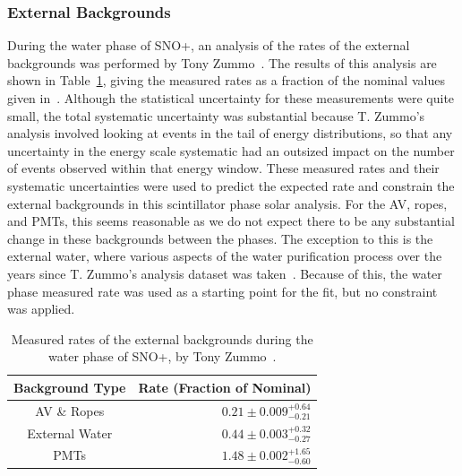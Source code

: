 \subsubsection{External Backgrounds}
During the water phase of SNO+, an analysis of the rates of the external backgrounds was performed by Tony Zummo~\cite{zummoExternalBackgroundBox2022}. %
The results of this analysis are shown in Table~\ref{tab:externals_rates_zummo}, giving the measured rates as a fraction of the nominal values given in~\cite{andringaCurrentStatusFuture2016}. %
Although the statistical uncertainty for these measurements were quite small, the total systematic uncertainty was substantial because T. Zummo's analysis involved looking at events in the tail of energy distributions, so that any uncertainty in the energy scale systematic had an outsized impact on the number of events observed within that energy window. These measured rates and their systematic uncertainties were used to predict the expected rate and constrain the external backgrounds in this scintillator phase solar analysis. For the AV, ropes, and PMTs, this seems reasonable as we do not expect there to be any substantial change in these backgrounds between the phases. The exception to this is the external water, where various aspects of the water purification process over the years since T. Zummo's analysis dataset was taken~\cite{kaptanogluFirstLookExternal2023}. Because of this, the water phase measured rate was used as a starting point for the fit, but no constraint was applied.

\begin{table}
    \centering
    \begin{tabular}{c r}
        \hline
        Background Type & Rate (Fraction of Nominal)  \\ \hline \hline
        AV \& Ropes    & $0.21\pm0.009^{+0.64}_{-0.21}$  \\
        External Water & $0.44\pm0.003^{+0.32}_{-0.27}$  \\
        PMTs           & $1.48\pm0.002^{+1.65}_{-0.60}$  \\
        \hline
    \end{tabular}
    \caption[Measured rates of the external backgrounds during the water phase of SNO+, by Tony Zummo]
    {Measured rates of the external backgrounds during the water phase of SNO+, by Tony Zummo~\cite{zummoExternalBackgroundBox2022}. %
    }
    \label{tab:externals_rates_zummo}
\end{table}

